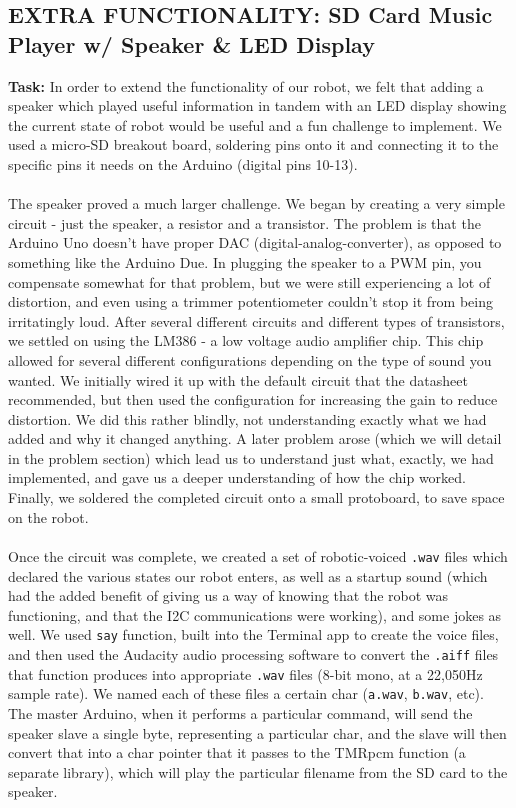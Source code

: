 \documentclass[paper=a4, fontsize=11pt]{scrartcl}
\numberwithin{equation}{section}		%
\numberwithin{figure}{section}			%
\numberwithin{table}{section}				%
\begin{document}
{\subsection{EXTRA FUNCTIONALITY: SD Card Music Player w/ Speaker \& LED Display}
\textbf{Task: } In order to extend the functionality of our robot, we felt that adding a speaker which played useful information in tandem with an LED display showing the current state of robot would be useful and a fun challenge to implement. We used a micro-SD breakout board, soldering pins onto it and connecting it to the specific pins it needs on the Arduino (digital pins 10-13).
\\\\
The speaker proved a much larger challenge. We began by creating a very simple circuit - just the speaker, a resistor and a transistor. The problem is that the Arduino Uno doesn't have proper DAC (digital-analog-converter), as opposed to something like the Arduino Due. In plugging the speaker to a PWM pin, you compensate somewhat for that problem, but we were still experiencing a lot of distortion, and even using a trimmer potentiometer couldn't stop it from being irritatingly loud. After several different circuits and different types of transistors, we settled on using the LM386 - a low voltage audio amplifier chip. This chip allowed for several different configurations depending on the type of sound you wanted. We initially wired it up with the default circuit that the datasheet recommended, but then used the configuration for increasing the gain to reduce distortion. We did this rather blindly, not understanding exactly what we had added and why it changed anything. A later problem arose (which we will detail in the problem section) which lead us to understand just what, exactly, we had implemented, and gave us a deeper understanding of how the chip worked. Finally, we soldered the completed circuit onto a small protoboard, to save space on the robot.
\\\\
Once the circuit was complete, we created a set of robotic-voiced \texttt{.wav} files which declared the various states our robot enters, as well as a startup sound (which had the added benefit of giving us a way of knowing that the robot was functioning, and that the I2C communications were working), and some jokes as well. We used \texttt{say} function, built into the Terminal app to create the voice files, and then used the Audacity audio processing software to convert the \texttt{.aiff} files that function produces into appropriate \texttt{.wav} files (8-bit mono, at a 22,050Hz sample rate). We named each of these files a certain char (\texttt{a.wav}, \texttt{b.wav}, etc). The master Arduino, when it performs a particular command, will send the speaker slave a single byte, representing a particular char, and the slave will then convert that into a char pointer that it passes to the TMRpcm function (a separate library), which will play the particular filename from the SD card to the speaker.
}
\end{document}
